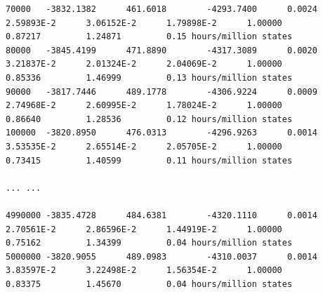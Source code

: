 \documentclass[12pt]{article}
\begin{document}
{\begin{verbatim}
70000	-3832.1382  	461.6018    	-4293.7400  	0.0024      	2.59893E-2  	3.06152E-2  	1.79898E-2  	1.00000     	0.87217     	1.24871     	0.15 hours/million states
80000	-3845.4199  	471.8890    	-4317.3089  	0.0020      	3.21837E-2  	2.01324E-2  	2.04069E-2  	1.00000     	0.85336     	1.46999     	0.13 hours/million states
90000	-3817.7446  	489.1778    	-4306.9224  	0.0009      	2.74968E-2  	2.60995E-2  	1.78024E-2  	1.00000     	0.86640     	1.28536     	0.12 hours/million states
100000	-3820.8950  	476.0313    	-4296.9263  	0.0014      	3.53535E-2  	2.65514E-2  	2.05705E-2  	1.00000     	0.73415     	1.40599     	0.11 hours/million states

... ...

4990000	-3835.4728  	484.6381    	-4320.1110  	0.0014      	2.70561E-2  	2.86596E-2  	1.44919E-2  	1.00000     	0.75162     	1.34399     	0.04 hours/million states
5000000	-3820.9055  	489.0983    	-4310.0037  	0.0014      	3.83597E-2  	3.22498E-2  	1.56354E-2  	1.00000     	0.83375     	1.45670     	0.04 hours/million states


\end{verbatim}}
\end{document}
